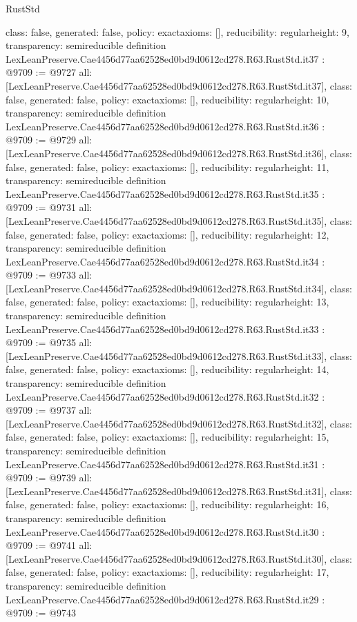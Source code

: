\begin{lexlean}{RustStd}
\begin{coremodule}
{  class: false,
  generated: false,
  policy: exact{axioms: []},
  reducibility: regular{height: 9},
  transparency: semireducible
}
definition LexLeanPreserve.Cae4456d77aa62528ed0bd9d0612cd278.R63.RustStd.it37 : @9709 := @9727 {
  all: [LexLeanPreserve.Cae4456d77aa62528ed0bd9d0612cd278.R63.RustStd.it37],
  class: false,
  generated: false,
  policy: exact{axioms: []},
  reducibility: regular{height: 10},
  transparency: semireducible
}
definition LexLeanPreserve.Cae4456d77aa62528ed0bd9d0612cd278.R63.RustStd.it36 : @9709 := @9729 {
  all: [LexLeanPreserve.Cae4456d77aa62528ed0bd9d0612cd278.R63.RustStd.it36],
  class: false,
  generated: false,
  policy: exact{axioms: []},
  reducibility: regular{height: 11},
  transparency: semireducible
}
definition LexLeanPreserve.Cae4456d77aa62528ed0bd9d0612cd278.R63.RustStd.it35 : @9709 := @9731 {
  all: [LexLeanPreserve.Cae4456d77aa62528ed0bd9d0612cd278.R63.RustStd.it35],
  class: false,
  generated: false,
  policy: exact{axioms: []},
  reducibility: regular{height: 12},
  transparency: semireducible
}
definition LexLeanPreserve.Cae4456d77aa62528ed0bd9d0612cd278.R63.RustStd.it34 : @9709 := @9733 {
  all: [LexLeanPreserve.Cae4456d77aa62528ed0bd9d0612cd278.R63.RustStd.it34],
  class: false,
  generated: false,
  policy: exact{axioms: []},
  reducibility: regular{height: 13},
  transparency: semireducible
}
definition LexLeanPreserve.Cae4456d77aa62528ed0bd9d0612cd278.R63.RustStd.it33 : @9709 := @9735 {
  all: [LexLeanPreserve.Cae4456d77aa62528ed0bd9d0612cd278.R63.RustStd.it33],
  class: false,
  generated: false,
  policy: exact{axioms: []},
  reducibility: regular{height: 14},
  transparency: semireducible
}
definition LexLeanPreserve.Cae4456d77aa62528ed0bd9d0612cd278.R63.RustStd.it32 : @9709 := @9737 {
  all: [LexLeanPreserve.Cae4456d77aa62528ed0bd9d0612cd278.R63.RustStd.it32],
  class: false,
  generated: false,
  policy: exact{axioms: []},
  reducibility: regular{height: 15},
  transparency: semireducible
}
definition LexLeanPreserve.Cae4456d77aa62528ed0bd9d0612cd278.R63.RustStd.it31 : @9709 := @9739 {
  all: [LexLeanPreserve.Cae4456d77aa62528ed0bd9d0612cd278.R63.RustStd.it31],
  class: false,
  generated: false,
  policy: exact{axioms: []},
  reducibility: regular{height: 16},
  transparency: semireducible
}
definition LexLeanPreserve.Cae4456d77aa62528ed0bd9d0612cd278.R63.RustStd.it30 : @9709 := @9741 {
  all: [LexLeanPreserve.Cae4456d77aa62528ed0bd9d0612cd278.R63.RustStd.it30],
  class: false,
  generated: false,
  policy: exact{axioms: []},
  reducibility: regular{height: 17},
  transparency: semireducible
}
definition LexLeanPreserve.Cae4456d77aa62528ed0bd9d0612cd278.R63.RustStd.it29 : @9709 := @9743 {
}
\end{coremodule}
\end{lexlean}

